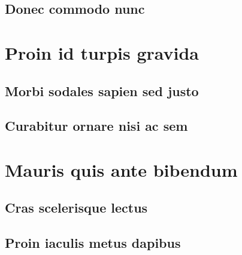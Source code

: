 \documentclass[10pt,a4paper]{article}
\theoremstyle{definition}
\theoremstyle{remark}
\begin{document}
\subsection{Donec commodo nunc}

\section{Proin id turpis gravida}
\subsection{Morbi sodales sapien sed justo}
\subsection{Curabitur ornare nisi ac sem}
\newpage
\section{Mauris quis ante bibendum}
\subsection{Cras scelerisque lectus}
\subsection{Proin iaculis metus dapibus}
\end{document}
